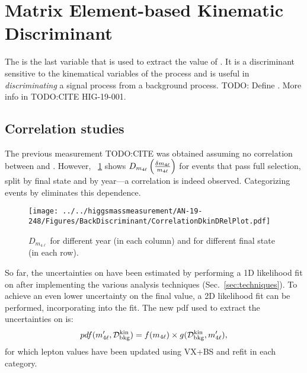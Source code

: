 \section{Matrix Element-based Kinematic Discriminant}
\label{sec:Dkin}
The \Dkinbkg is the last variable that is used to extract the value of \mH.
It is a discriminant sensitive to the kinematical variables of the \qqggzzfourl process and is useful in \emph{discriminating} a signal process from a background process.
TODO: Define \Dkinbkg.
More info in TODO:CITE HIG-19-001.


\subsection{Correlation studies}
\label{sec:DkinCorrelation}
The previous \mH measurement TODO:CITE was obtained assuming no correlation between \relmfourlerrflat and \Dkinbkg.
However, \figurename~\ref{Dkin_sigma_correlation} shows $D_{m_{4\ell}} \left( \frac{\delta m_{4\ell}}{m_{4\ell}} \right)$ \vs \Dkinbkg for events that pass full selection, split by final state and by year---a correlation is indeed observed.
Categorizing events by \relmfourlerrflat eliminates this dependence.
\begin{figure}[!htbp]
\begin{center}
	\texttt{[image: ../../higgsmassmeasurement/AN-19-248/Figures/BackDiscriminant/CorrelationDkinDRelPlot.pdf]}
\caption{$D_{m_{4\ell}}$ \vs \Dkinbkg for different year (in each column) and for different final state (in each row).}
\label{Dkin_sigma_correlation}
\end{center}
\end{figure}

So far, the uncertainties on \mH have been estimated by performing a 1D likelihood fit on \mfourl after implementing the various analysis techniques (Sec.~\ref{sec:techniques}).
To achieve an even lower uncertainty on the final \mH value, a 2D likelihood fit can be performed, incorporating \Dkinbkg into the fit.
The new pdf used to extract the uncertainties on \mH is:
\[
pdf(m'_{4\ell}, \mathcal{D}^{\text{kin}}_{\text{bkg}}) = f(m_{4\ell}) \times g(\mathcal{D}^{\text{kin}}_{\text{bkg}}, m'_{4\ell}),
\]
for which lepton \pt values have been updated using VX+BS and \Zone refit in each category.

